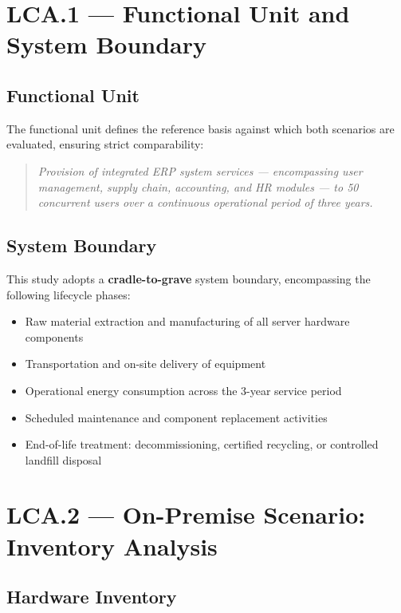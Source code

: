 \section{LCA.1 --- Functional Unit and System Boundary}

\subsection{Functional Unit}

The functional unit defines the reference basis against which both
scenarios are evaluated, ensuring strict comparability:

\begin{quote}
\textit{Provision of integrated ERP system services --- encompassing user
management, supply chain, accounting, and HR modules --- to 50 concurrent
users over a continuous operational period of three years.}
\end{quote}

\subsection{System Boundary}

This study adopts a \textbf{cradle-to-grave} system boundary, encompassing
the following lifecycle phases:
\begin{itemize}[label=\textcolor{lightgreen}{--}]
  \item Raw material extraction and manufacturing of all server hardware
    components
  \item Transportation and on-site delivery of equipment
  \item Operational energy consumption across the 3-year service period
  \item Scheduled maintenance and component replacement activities
  \item End-of-life treatment: decommissioning, certified recycling, or
    controlled landfill disposal
\end{itemize}

\section{LCA.2 --- On-Premise Scenario: Inventory Analysis}

\subsection{Hardware Inventory}

